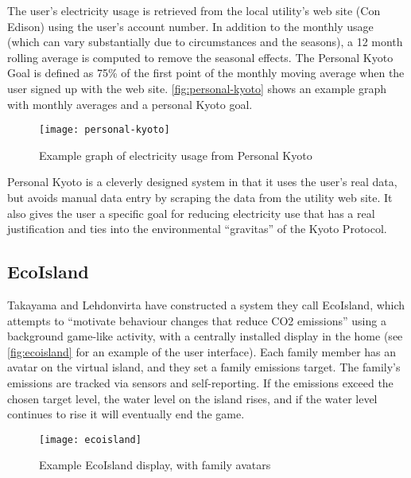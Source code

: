 The user's electricity usage is retrieved from the local utility's web site (Con Edison) using the user's account number. In addition to the monthly usage (which can vary substantially due to circumstances and the seasons), a 12 month rolling average is computed to remove the seasonal effects. The Personal Kyoto Goal is defined as 75\% of the first point of the monthly moving average when the user signed up with the web site. \autoref{fig:personal-kyoto} shows an example graph with monthly averages and a personal Kyoto goal.

\begin{figure}[htbp]
	\begin{center}
		\texttt{[image: personal-kyoto]}
		\caption{Example graph of electricity usage from Personal Kyoto}
		\label{fig:personal-kyoto}
 	\end{center}
\end{figure}

Personal Kyoto is a cleverly designed system in that it uses the user's real data, but avoids manual data entry by scraping the data from the utility web site. It also gives the user a specific goal for reducing electricity use that has a real justification and ties into the environmental ``gravitas'' of the Kyoto Protocol.

\subsection{EcoIsland}
\label{ecoisland}

Takayama and Lehdonvirta have constructed a system they call EcoIsland, which attempts to ``motivate behaviour changes that reduce CO2 emissions'' using a background game-like activity, with a centrally installed display in the home \cite{takayama-2008} (see \autoref{fig:ecoisland} for an example of the user interface). Each family member has an avatar on the virtual island, and they set a family \COtwo emissions target. The family's emissions are tracked via sensors and self-reporting. If the emissions exceed the chosen target level, the water level on the island rises, and if the water level continues to rise it will eventually end the game.

\begin{figure}[htb]
	\begin{center}
		\texttt{[image: ecoisland]}
		\caption{Example EcoIsland display, with family avatars}
		\label{fig:ecoisland}
 	\end{center}
\end{figure}

